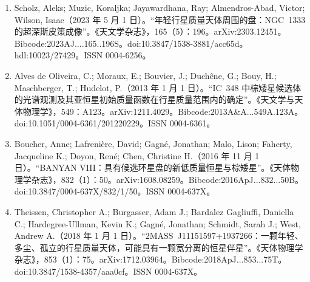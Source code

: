 \begin{enumerate}
\item Scholz, Aleks; Muzic, Koraljka; Jayawardhana, Ray; Almendros-Abad, Victor; Wilson, Isaac（2023 年 5 月 1 日）。“年轻行星质量天体周围的盘：NGC~1333 的超深斯皮策成像”。《天文学杂志》，165（5）：196。arXiv:2303.12451。Bibcode:2023AJ....165..196S。doi:10.3847/1538-3881/acc65d。hdl:10023/27429。ISSN 0004-6256。  
\item Alves de Oliveira, C.; Moraux, E.; Bouvier, J.; Duchêne, G.; Bouy, H.; Maschberger, T.; Hudelot, P.（2013 年 1 月 1 日）。“IC~348 中棕矮星候选体的光谱观测及其亚恒星初始质量函数在行星质量范围内的确定”。《天文学与天体物理学》，549：A123。arXiv:1211.4029。Bibcode:2013A\&A...549A.123A。doi:10.1051/0004-6361/201220229。ISSN 0004-6361。  
\item Boucher, Anne; Lafrenière, David; Gagné, Jonathan; Malo, Lison; Faherty, Jacqueline K.; Doyon, René; Chen, Christine H.（2016 年 11 月 1 日）。“BANYAN VIII：具有候选环星盘的新低质量恒星与棕矮星”。《天体物理学杂志》，832（1）：50。arXiv:1608.08259。Bibcode:2016ApJ...832...50B。doi:10.3847/0004-637X/832/1/50。ISSN 0004-637X。  
\item Theissen, Christopher A.; Burgasser, Adam J.; Bardalez Gagliuffi, Daniella C.; Hardegree-Ullman, Kevin K.; Gagné, Jonathan; Schmidt, Sarah J.; West, Andrew A.（2018 年 1 月 1 日）。“2MASS~J11151597+1937266：一颗年轻、多尘、孤立的行星质量天体，可能具有一颗宽分离的恒星伴星”。《天体物理学杂志》，853（1）：75。arXiv:1712.03964。Bibcode:2018ApJ...853...75T。doi:10.3847/1538-4357/aaa0cf。ISSN 0004-637X。







\end{enumerate}